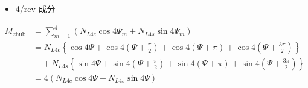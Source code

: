     \begin{itemize}
    \item 4/rev 成分
    \end{itemize}


    \begin{align}
    M_{z\mathrm{hub}}
    &= \sum_{m=1}^{4}
    \left(
    N_{L4c}\cos 4\Psi_m + N_{L4s}\sin 4\Psi_m
    \right)  \nonumber \\
    &= N_{L4c}
    \left\{
    \cos 4\Psi
    + \cos 4\left(\Psi + \frac{\pi}{2}\right)
    + \cos 4(\Psi + \pi)
    + \cos 4\left(\Psi + \frac{3\pi}{2}\right)
    \right\} \nonumber \\
    &\quad
    + N_{L4s}
    \left\{
    \sin 4\Psi
    + \sin 4\left(\Psi + \frac{\pi}{2}\right)
    + \sin 4(\Psi + \pi)
    + \sin 4\left(\Psi + \frac{3\pi}{2}\right)
    \right\} \nonumber \\
    &= 4\left(
    N_{L4c}\cos 4\Psi + N_{L4s}\sin 4\Psi
    \right)
    \end{align}
